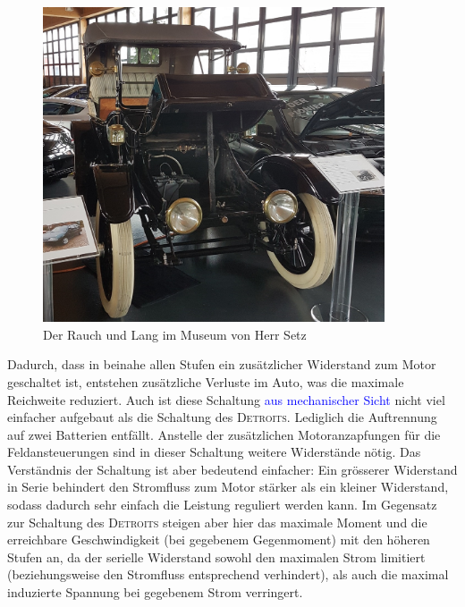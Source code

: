\begin{figure}[p]
	\centering
		\includegraphics[width=0.9\textwidth]{images/Setz.JPG}
	\caption{Der Rauch und Lang im Museum von Herr Setz}
	\label{fig:Setz}
\end{figure}

Dadurch, dass in beinahe allen Stufen ein zusätzlicher Widerstand zum Motor geschaltet ist, entstehen zusätzliche Verluste im Auto, was die maximale Reichweite reduziert. Auch ist diese Schaltung \textcolor{blue}{aus mechanischer Sicht} nicht viel einfacher aufgebaut als die Schaltung des \textsc{Detroits}. Lediglich die Auftrennung auf zwei Batterien entfällt. Anstelle der zusätzlichen Motoranzapfungen für die Feldansteuerungen sind in dieser Schaltung weitere Widerstände nötig. Das Verständnis der Schaltung ist aber bedeutend einfacher: Ein grösserer Widerstand in Serie behindert den Stromfluss zum Motor stärker als ein kleiner Widerstand, sodass dadurch sehr einfach die Leistung reguliert werden kann. Im Gegensatz zur Schaltung des \textsc{Detroits} steigen aber hier das maximale Moment und die erreichbare Geschwindigkeit (bei gegebenem Gegenmoment) mit den höheren Stufen an, da der serielle Widerstand sowohl den maximalen Strom limitiert (beziehungsweise den Stromfluss entsprechend verhindert), als auch die maximal induzierte Spannung bei gegebenem Strom verringert.